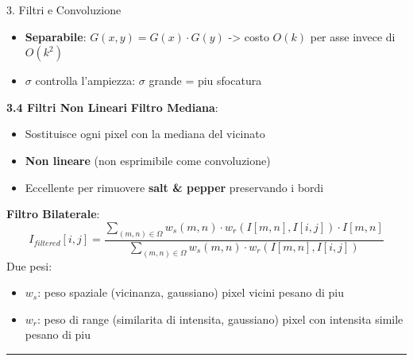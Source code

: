 \documentclass[italian,10pt]{beamer}
\begin{document}
\begin{frame}[allowframebreaks]{3. Filtri e Convoluzione}
\begin{itemize}
\item \textbf{Separabile}: $G(x,y) = G(x) \cdot G(y)$ -> costo $O(k)$ per asse invece di $O(k^2)$
\item $\sigma$ controlla l'ampiezza: $\sigma$ grande = piu sfocatura
\end{itemize}
\textbf{3.4 Filtri Non Lineari}
\textbf{Filtro Mediana}:
\begin{itemize}
\item Sostituisce ogni pixel con la mediana del vicinato
\item \textbf{Non lineare} (non esprimibile come convoluzione)
\item Eccellente per rimuovere \textbf{salt \& pepper} preservando i bordi
\end{itemize}
\textbf{Filtro Bilaterale}:
\[ I_{filtered}[i,j] = \frac{\sum_{(m,n) \in \Omega} w_s(m,n) \cdot w_r(I[m,n], I[i,j]) \cdot I[m,n]}{\sum_{(m,n) \in \Omega} w_s(m,n) \cdot w_r(I[m,n], I[i,j])} \]
Due pesi:
\begin{itemize}
\item $w_s$: peso spaziale (vicinanza, gaussiano)  pixel vicini pesano di piu
\item $w_r$: peso di range (similarita di intensita, gaussiano)  pixel con intensita simile pesano di piu
\end{itemize}
\medskip\noindent\rule{\textwidth}{0.4pt}\medskip
\end{frame}
\end{document}
